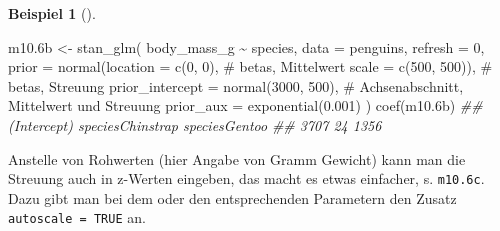 \documentclass[
  ngerman,
  letterpaper,
  twoside,
  open=any]{scrbook}
\newenvironment{Shaded}{\begin{snugshade}}{\end{snugshade}}
\newcommand{\AttributeTok}[1]{\textcolor[rgb]{0.40,0.45,0.13}{#1}}
\newcommand{\CommentTok}[1]{\textcolor[rgb]{0.37,0.37,0.37}{#1}}
\newcommand{\DecValTok}[1]{\textcolor[rgb]{0.68,0.00,0.00}{#1}}
\newcommand{\DocumentationTok}[1]{\textcolor[rgb]{0.37,0.37,0.37}{\textit{#1}}}
\newcommand{\FloatTok}[1]{\textcolor[rgb]{0.68,0.00,0.00}{#1}}
\newcommand{\FunctionTok}[1]{\textcolor[rgb]{0.28,0.35,0.67}{#1}}
\newcommand{\NormalTok}[1]{\textcolor[rgb]{0.00,0.23,0.31}{#1}}
\newcommand{\OtherTok}[1]{\textcolor[rgb]{0.00,0.23,0.31}{#1}}
\newcommand{\SpecialCharTok}[1]{\textcolor[rgb]{0.37,0.37,0.37}{#1}}
\theoremstyle{definition}
\newtheorem{example}{Beispiel}[chapter]
\theoremstyle{plain}
\theoremstyle{definition}
\theoremstyle{definition}
\theoremstyle{remark}
\begin{document}
\begin{example}[]
\begin{Shaded}
\begin{Highlighting}[]
\NormalTok{m10}\FloatTok{.6}\NormalTok{b }\OtherTok{\textless{}{-}} \FunctionTok{stan\_glm}\NormalTok{(}
\NormalTok{  body\_mass\_g }\SpecialCharTok{\textasciitilde{}}\NormalTok{ species, }
  \AttributeTok{data =}\NormalTok{ penguins, }
  \AttributeTok{refresh =} \DecValTok{0}\NormalTok{,}
  \AttributeTok{prior =} \FunctionTok{normal}\NormalTok{(}\AttributeTok{location =} \FunctionTok{c}\NormalTok{(}\DecValTok{0}\NormalTok{, }\DecValTok{0}\NormalTok{),  }\CommentTok{\# betas, Mittelwert}
                 \AttributeTok{scale =} \FunctionTok{c}\NormalTok{(}\DecValTok{500}\NormalTok{, }\DecValTok{500}\NormalTok{)),  }\CommentTok{\# betas, Streuung}
  \AttributeTok{prior\_intercept =} \FunctionTok{normal}\NormalTok{(}\DecValTok{3000}\NormalTok{, }\DecValTok{500}\NormalTok{),  }\CommentTok{\# Achsenabschnitt, Mittelwert und Streuung}
  \AttributeTok{prior\_aux =} \FunctionTok{exponential}\NormalTok{(}\FloatTok{0.001}\NormalTok{)}
\NormalTok{)}
\FunctionTok{coef}\NormalTok{(m10}\FloatTok{.6}\NormalTok{b)}
\DocumentationTok{\#\#      (Intercept) speciesChinstrap    speciesGentoo }
\DocumentationTok{\#\#             3707               24             1356}
\end{Highlighting}
\end{Shaded}

Anstelle von Rohwerten (hier Angabe von Gramm Gewicht) kann man die
Streuung auch in z-Werten eingeben, das macht es etwas einfacher, s.
\texttt{m10.6c}. Dazu gibt man bei dem oder den entsprechenden
Parametern den Zusatz \texttt{autoscale\ =\ TRUE} an.


\end{example}
\end{document}
